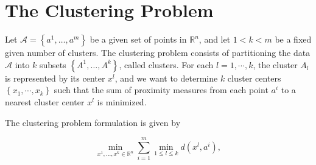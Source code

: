 \documentclass[11pt]{article}
\numberwithin{equation}{section}
\begin{document}
%
%
%
%
%
%
%
%
%
%
%
%
%
%
%
%
%
%
%
%
%

\newpage

\section{The Clustering Problem}

Let $\mathcal{A}= \left\lbrace a^1, \dots ,a^m \right\rbrace$ be a given set of points in $\mathbb{R}^n$, and let $1 < k < m$ be a fixed given number of clusters. The clustering problem consists of partitioning the data $\mathcal{A}$ into $k$ subsets $\left\lbrace A^1, \dots ,A^k \right\rbrace$, called clusters. For each $l=1, \cdots ,k$, the cluster $A_l$ is represented by its center $x^l$, and we want to determine $k$ cluster centers $\left\lbrace x_1, \cdots ,x_k \right\rbrace$ such that the sum of proximity measures from each point $a^i$ to a nearest cluster center $x^l$ is minimized.

The clustering problem formulation is given by

\begin{equation}
	\min\limits_{x^1, \dots ,x^k \in \mathbb{R}^n} \sum\limits_{i=1}^{m} \min\limits_{1 \le l \le k} d(x^l,a^i) , \label{StateEq1}
\end{equation}
\end{document}
